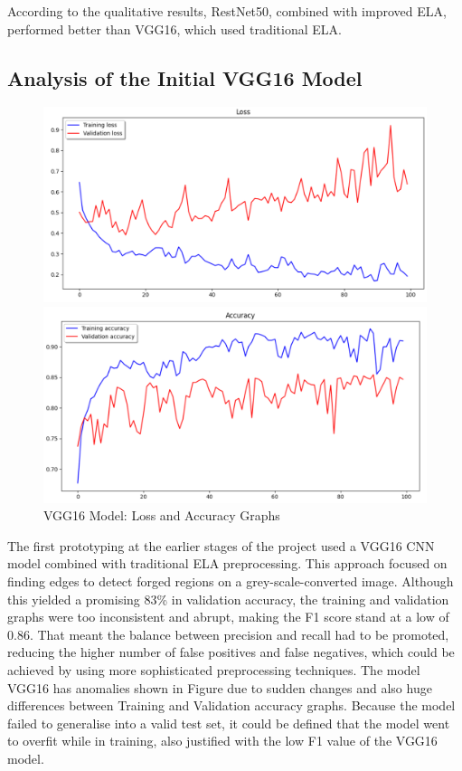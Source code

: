 \documentclass{ieeeaccess}
\begin{document}
  According to the qualitative results, RestNet50, combined with improved ELA, performed better than VGG16, which used traditional ELA.
  
\subsection{Analysis of the Initial VGG16 Model}
    \begin{figure}[h!]
  	\centering
  	\begin{minipage}{0.45\textwidth}
  		\centering
  		\includegraphics[width=\linewidth]{LOSS_VGG16.png}
  	\end{minipage}
  	\hfill
  	\begin{minipage}{0.45\textwidth}
  		\centering
  		\includegraphics[width=\linewidth]{VGG16_ACC.png}
  	\end{minipage}
  	\caption{VGG16 Model: Loss and Accuracy Graphs}
  	\label{fig:vgg16-graphs}
  \end{figure}
  
  The first prototyping at the earlier stages of the project used a VGG16 CNN model combined with traditional ELA preprocessing. This approach focused on finding edges to detect forged regions on a grey-scale-converted image. Although this yielded a promising 83\% in validation accuracy, the training and validation graphs were too inconsistent and abrupt, making the F1 score stand at a low of 0.86. That meant the balance between precision and recall had to be promoted, reducing the higher number of false positives and false negatives, which could be achieved by using more sophisticated preprocessing techniques. The model VGG16 has anomalies shown in Figure due to sudden changes and also huge differences between Training and Validation accuracy graphs. Because the model failed to generalise into a valid test set, it could be defined that the model went to overfit while in training, also justified with the low F1 value of the VGG16 model.
  
\end{document}
